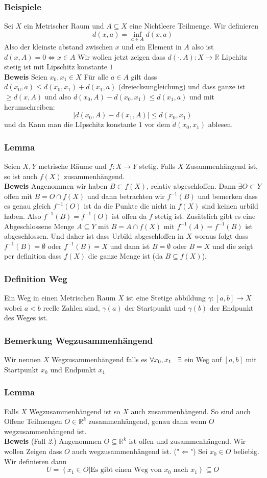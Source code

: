\documentclass{article}
\newcommand{\smspc}{\hspace{0.3cm}}
\newcommand{\beweis}{\\\textbf{Beweis }}
\newcommand{\beispiel}[1]{\subsubsection*{Beispiele {#1}}}
\newcommand{\bemerkung}[1]{\subsubsection*{Bemerkung {#1}}}
\newcommand{\lemma}[1]{\subsubsection*{Lemma {#1}}}
\newcommand{\definition}[1]{\subsubsection*{Definition {#1}}}
\begin{document}
\beispiel{}
Sei $X$ ein Metrischer Raum und $A \subseteq X$ eine Nichtleere Teilmenge. Wir definieren \[d(x,a)=\inf_{a\in A}d(x,a)\]
Also der kleinste abstand zwischen $x$ und ein Element in $A$ also ist $d(x,A)=0 \Leftrightarrow x\in A$\newline
Wir wollen jetzt zeigen dass $d(\cdot,A):X \rightarrow \mathbb{R}$ Lipchitz stetig ist mit Lipschitz konstante $1$
\beweis Seien $x_0,x_1\in X$ Für alle $a\in A$ gilt dass $d(x_0,a)\le d(x_0,x_1)+d(x_1,a)$ (dreiecksungleichung) und dass ganze ist $\ge d(x,A)$ und also $ d(x_0,A)-d(x_0,x_1)\le d(x_1,a)$ und mit herumschreiben:
\[\left| d(x_0,A)-d(x_1, A)\right|\le d(x_0,x_1)\] und da Kann man die LIpschitz konstante $1$ vor dem $d(x_0,x_1)$ ablesen.
\lemma{} Seien $X,Y$ metrische Räume und $f:X \rightarrow Y$ stetig. Falls $X$ Zusammenhängend ist, so ist auch $f(X)$ zusammenhängend.
\beweis Angenommen wir haben $B \subset f(X)$, relativ abgeschloffen. Dann $\exists O\subset Y$ offen mit $B=O\cap f(X)$ und dann betrachten wir $f^{-1}(B)$ und bemerken dass es genau gleich $f^{-1}(O)$ ist da die Punkte die nicht in $f(X)$ sind keinen urbild haben. Also $f^{-1}(B)=f^{-1}(O)$ ist offen da $f$ stetig ist. Zusätslich gibt es eine Abgeschlossene Menge $A\subseteq Y$ mit $B=A\cap f(X)$ mit $f^{-1}(A)=f^{-1}(B)$ ist abgeschlossen. Und daher ist dass Urbild abgeschloffen in $X$ woraus folgt dass $f^{-1}(B)=\emptyset$ oder $f^{-1}(B)=X$ und dann ist $B=\emptyset$ oder $B=X$ und die zeigt per definition dass $f(X)$ die ganze Menge ist (da $B \subseteq f(X)$).
\definition{Weg} Ein Weg in einen Metrischen Raum $X$ ist eine Stetige abbildung $\gamma:[a,b] \rightarrow X$ wobei $a<b$ reelle Zahlen sind, $\gamma(a)$ der Startpunkt und $\gamma(b)$ der Endpunkt des Weges ist. 
\bemerkung{Wegzusammenhängend} Wir nennen $X$ Wegzusammenhängend falls es $\forall x_0, x_1\smspc \exists$ ein Weg auf $[a,b]$ mit Startpunkt $x_0$ und Endpunkt $x_1$
\lemma{} Falls $X$ Wegzusammenhängend ist so $X$ auch zusammenhängend. So sind auch Offene Teilmengen $O\in \mathbb{R}^k$ zusammenhängend, genau dann wenn $O$ wegzusammenhängend ist.
\beweis (Fall \textit{2.}) Angenommen $O \subseteq \mathbb{R}^k$ ist offen und zusammenhängend. Wir wollen Zeigen dass $O$ auch wegzusammenhängend ist. ("$\Leftarrow$")\newline
Sei $x_0\in O$ beliebig. Wir definieren dann \[U=\left\lbrace x_1\in O\left|\text{Es gibt einen Weg von }x_0 \text{ nach }x_1\right.\right\rbrace\subseteq O\]
\end{document}
